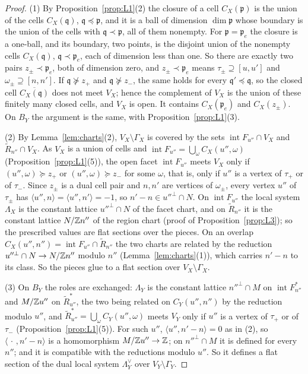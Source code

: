 \begin{proof}
(1) By Proposition~\ref{prop:L1}(2) the closure of a cell $C_X(\mathfrak p)$ is the union of the cells $C_X(\mathfrak q)$,
$\mathfrak q\preceq\mathfrak p$, and it is a ball of dimension $\dim\mathfrak p$ whose boundary is the union of the cells with
$\mathfrak q\prec\mathfrak p$, all of them nonempty. For $\mathfrak p=\mathfrak p_e$ the closure is a one-ball, and its
boundary, two points, is the disjoint union of the nonempty cells $C_X(\mathfrak q)$, $\mathfrak q\prec\mathfrak p_e$, each of
dimension less than one. So there are exactly two pairs $z_\pm\prec\mathfrak p_e$, both of dimension zero, and $z_\pm\prec\mathfrak p_e$ means $\tau_\pm\supseteq[u,u']$ and
$\omega_\pm\supseteq[n,n']$. If $\mathfrak q\not\succeq z_+$ and $\mathfrak q\not\succeq z_-$, the same holds for every
$\mathfrak q'\preceq\mathfrak q$, so the closed cell $\overline{C_X(\mathfrak q)}$ does not meet $V_X$; hence the complement of
$V_X$ is the union of these finitely many closed cells, and $V_X$ is open. It contains $C_X(\mathfrak p_e)$ and
$C_X(z_\pm)$. On $B_Y$ the argument is the same, with Proposition~\ref{prop:L1}(3).

(2) By Lemma~\ref{lem:charts}(2), $V_X\setminus\Gamma_X$ is covered by the sets $\operatorname{int}F_{u''}\cap V_X$ and
$\widetilde R_{n''}\cap V_X$. As $V_X$ is a union of cells and $\operatorname{int}F_{u''}=\bigcup_\omega C_X(u'',\omega)$
(Proposition~\ref{prop:L1}(5)), the open facet $\operatorname{int}F_{u''}$ meets $V_X$ only if $(u'',\omega)\succeq z_+$ or
$(u'',\omega)\succeq z_-$ for some $\omega$, that is, only if $u''$ is a vertex of $\tau_+$ or of $\tau_-$. Since $z_\pm$ is a
dual cell pair and $n,n'$ are vertices of $\omega_\pm$, every vertex $u''$ of $\tau_\pm$ has $\langle u'',n\rangle=\langle
u'',n'\rangle=-1$, so $n'-n\in u''^\perp\cap N$. On $\operatorname{int}F_{u''}$ the local system $\Lambda_X$ is the constant
lattice $u''^\perp\cap N$ of the facet chart, and on $\widetilde R_{n''}$ it is the constant lattice $N/\mathbb Z n''$ of the region
chart (proof of Proposition~\ref{prop:L3}); so the prescribed values are flat sections over the pieces. On an overlap
$C_X(u'',n'')=\operatorname{int}F_{u''}\cap\widetilde R_{n''}$ the two charts are related by the reduction
$u''^\perp\cap N\to N/\mathbb Z n''$ modulo $n''$ (Lemma~\ref{lem:charts}(1)), which carries $n'-n$ to its class. So the pieces glue
to a flat section over $V_X\setminus\Gamma_X$.

(3) On $B_Y$ the roles are exchanged: $\Lambda_Y$ is the constant lattice $n''^\perp\cap M$ on $\operatorname{int}F^*_{n''}$
and $M/\mathbb Z u''$ on $\widetilde R^*_{u''}$, the two being related on $C_Y(u'',n'')$ by the reduction modulo $u''$, and
$\widetilde R^*_{u''}=\bigcup_\omega C_Y(u'',\omega)$ meets $V_Y$ only if $u''$ is a vertex of $\tau_+$ or of $\tau_-$
(Proposition~\ref{prop:L1}(5)). For such $u''$, $\langle u'',n'-n\rangle=0$ as in (2), so $\langle\,\cdot\,,n'-n\rangle$ is a
homomorphism $M/\mathbb Z u''\to\mathbb Z$; on $n''^\perp\cap M$ it is defined for every $n''$; and it is compatible with the reductions
modulo $u''$. So it defines a flat section of the dual local system $\Lambda_Y^\vee$ over $V_Y\setminus\Gamma_Y$.
\end{proof}

